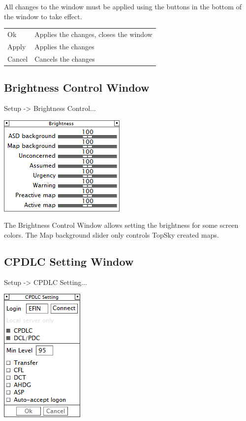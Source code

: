 \documentclass[11pt,a4paper]{memoir}
\begin{document}
All changes to the window must be applied using the buttons in the bottom of the window to take effect.

\begin{tabular}{l l}
    Ok      & Applies the changes, closes the window\\
    Apply   & Applies the changes\\
    Cancel  & Cancels the changes\\
\end{tabular}

\subsection{Brightness Control Window}
\label{win:bcw}

\textit{} Setup -> Brightness Control...

\includegraphics{img/bright.png}

The Brightness Control Window allows setting the brightness for some screen colors. The Map background slider only controls TopSky created maps.

\subsection{CPDLC Setting Window}
\label{win:dls}

\textit{} Setup -> CPDLC Setting...

\includegraphics{img/dlsetup.png}
\end{document}
